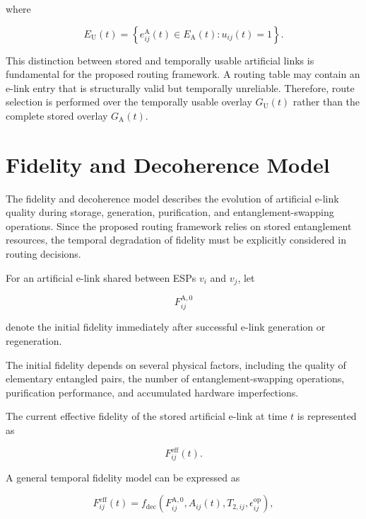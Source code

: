 where

\begin{equation}
    E_{\mathrm{U}}(t)
    =
    \left\{
    e_{ij}^{\mathrm{A}}(t)
    \in
    E_{\mathrm{A}}(t)
    :
    u_{ij}(t)=1
    \right\}.
\end{equation}

This distinction between stored and temporally usable artificial links is fundamental for the proposed routing framework. A routing table may contain an e-link entry that is structurally valid but temporally unreliable. Therefore, route selection is performed over the temporally usable overlay $G_{\mathrm{U}}(t)$ rather than the complete stored overlay $G_{\mathrm{A}}(t)$.
\section{Fidelity and Decoherence Model}

The fidelity and decoherence model describes the evolution of artificial e-link quality during storage, generation, purification, and entanglement-swapping operations. Since the proposed routing framework relies on stored entanglement resources, the temporal degradation of fidelity must be explicitly considered in routing decisions.

For an artificial e-link shared between ESPs $v_i$ and $v_j$, let

\begin{equation}
    F_{ij}^{\mathrm{A},0}
\end{equation}

denote the initial fidelity immediately after successful e-link generation or regeneration.

The initial fidelity depends on several physical factors, including the quality of elementary entangled pairs, the number of entanglement-swapping operations, purification performance, and accumulated hardware imperfections.

The current effective fidelity of the stored artificial e-link at time $t$ is represented as

\begin{equation}
    F_{ij}^{\mathrm{eff}}(t).
\end{equation}

A general temporal fidelity model can be expressed as

\begin{equation}
    F_{ij}^{\mathrm{eff}}(t)
    =
    f_{\mathrm{dec}}
    \left(
    F_{ij}^{\mathrm{A},0},
    A_{ij}(t),
    T_{2,ij},
    \epsilon_{ij}^{\mathrm{op}}
    \right),
\end{equation}

